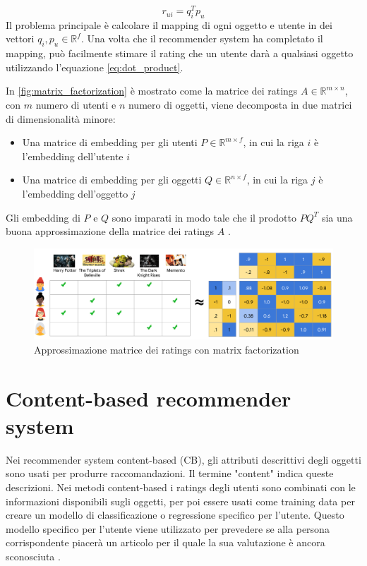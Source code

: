 \documentclass[12pt,italian]{report}
\begin{document}
\begin{equation} \label{eq:dot_product}
r_{ui} = q_i^Tp_u
\end{equation}
Il problema principale è calcolare il mapping di ogni oggetto e utente in dei vettori $q_i, p_u \in \mathbb{R}^f$. Una volta che il recommender system ha completato il mapping, può facilmente stimare il rating che un utente darà a qualsiasi oggetto utilizzando l'equazione \ref{eq:dot_product}. 

In \autoref{fig:matrix_factorization} è mostrato come la matrice dei ratings $A \in \mathbb{R}^{m \times n}$, con $m$ numero di utenti e $n$ numero di oggetti, viene decomposta in due matrici di dimensionalità minore:

\begin{itemize}
	\item Una matrice di embedding per gli utenti $P \in \mathbb{R}^{m \times f}$, in cui la riga $i$ è l'embedding dell'utente $i$
	\item Una matrice di embedding per gli oggetti $Q \in \mathbb{R}^{n \times f}$, in cui la riga $j$ è l'embedding dell'oggetto $j$
\end{itemize}
Gli embedding di $P$ e $Q$ sono imparati in modo tale che il prodotto $PQ^T$ sia una buona approssimazione della matrice dei ratings $A$ \cite{mf-google}.

\begin{figure}
  \includegraphics[width=\linewidth]{immagini/matrix_factorization.pdf}
  \caption{Approssimazione matrice dei ratings con matrix factorization}
  \label{fig:matrix_factorization}
\end{figure}

\section{Content-based recommender system}
Nei recommender system content-based (CB), gli attributi descrittivi degli oggetti sono usati per produrre raccomandazioni. Il termine "content" indica queste descrizioni. Nei metodi content-based i ratings degli utenti sono combinati con le informazioni disponibili sugli oggetti, per poi essere usati come training data per creare un modello di classificazione o regressione specifico per l'utente. Questo modello specifico per l'utente viene utilizzato per prevedere se alla persona corrispondente piacerà un articolo per il quale la sua valutazione è ancora sconosciuta \cite{recsys-book}.
\end{document}
